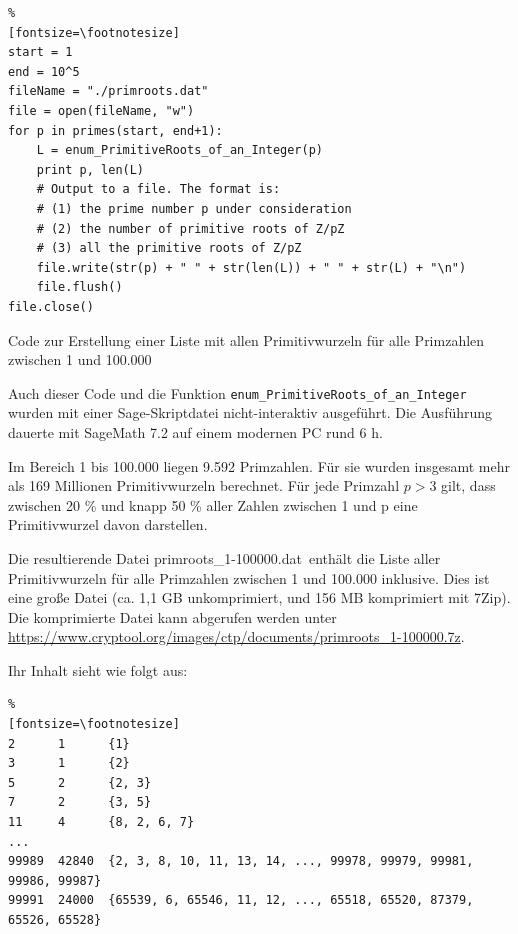 \begin{refsegment}
\begin{sagecode}
\begin{Verbatim}%
[fontsize=\footnotesize]
start = 1
end = 10^5
fileName = "./primroots.dat"
file = open(fileName, "w")
for p in primes(start, end+1):
    L = enum_PrimitiveRoots_of_an_Integer(p)
    print p, len(L)
    # Output to a file. The format is:
    # (1) the prime number p under consideration
    # (2) the number of primitive roots of Z/pZ
    # (3) all the primitive roots of Z/pZ
    file.write(str(p) + " " + str(len(L)) + " " + str(L) + "\n")
    file.flush()
file.close()
\end{Verbatim}
\caption{Code zur Erstellung einer Liste mit allen Primitivwurzeln für alle Primzahlen
         zwischen 1 und 100.000}
\end{sagecode}

Auch dieser Code und die Funktion \verb!enum_PrimitiveRoots_of_an_Integer!
wurden mit einer Sage-Skriptdatei nicht-interaktiv ausgeführt.
Die Ausführung dauerte mit SageMath 7.2 auf einem modernen PC rund 6 h.

Im Bereich 1 bis 100.000 liegen 9.592 Primzahlen. Für sie wurden insgesamt mehr als
169 Millionen Primitivwurzeln berechnet. Für jede Primzahl $p>3$ gilt, dass zwischen
20 \% und knapp 50 \% aller Zahlen zwischen 1 und p eine Primitivwurzel davon darstellen.

Die resultierende Datei \glqq primroots\_1-100000.dat\grqq~enthält die Liste
aller Primitivwurzeln für alle Primzahlen zwischen 1 und 100.000 inklusive.
Dies ist eine große Datei (ca. 1,1 GB unkomprimiert, und 156 MB komprimiert mit 7Zip).
Die komprimierte Datei kann abgerufen werden unter\\
\url{https://www.cryptool.org/images/ctp/documents/primroots_1-100000.7z}.

Ihr Inhalt sieht wie folgt aus:
\begin{Verbatim}%
[fontsize=\footnotesize]
2      1      {1}
3      1      {2}
5      2      {2, 3}
7      2      {3, 5}
11     4      {8, 2, 6, 7}
...
99989  42840  {2, 3, 8, 10, 11, 13, 14, ..., 99978, 99979, 99981, 99986, 99987}
99991  24000  {65539, 6, 65546, 11, 12, ..., 65518, 65520, 87379, 65526, 65528}
\end{Verbatim}





\end{refsegment}
